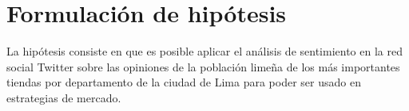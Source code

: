 %
\chapter{Formulaci\'on de hip\'otesis}

La hip\'otesis consiste en que es posible aplicar el an\'alisis de sentimiento en la red social Twitter sobre las opiniones de la población lime\~na de los más importantes tiendas por departamento de la ciudad de Lima para poder ser usado en estrategias de mercado.

\cleardoublepage